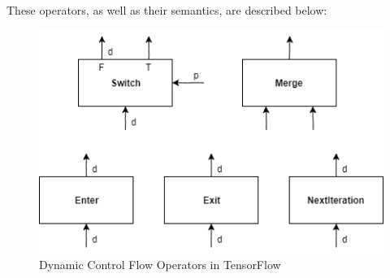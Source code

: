 \documentclass[ack,preface]{dithesis}
\begin{document}
These operators, as well as their semantics, are described below:

\begin{figure}
\centering
\includegraphics[scale=0.8]{figures/TFoperators}
\caption{ Dynamic Control Flow Operators in TensorFlow}
\end{figure}
\end{document}
